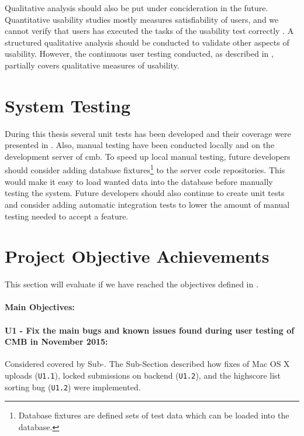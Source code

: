 Qualitative analysis should also be put under concideration in the future. Quantitative usability studies mostly measures satisfiability of users, and we cannot verify that users has executed the tasks of the usability test correctly \cite{holzinger2005}. A structured qualitative analysis should be conducted to validate other aspects of usability. However, the continuous user testing conducted, as described in , partially covers qualitative measures of usability.

\section{System Testing}
\label{sec:eval-sys-testing}
During this thesis several unit tests has been developed and their coverage were presented in . Also, manual testing have been conducted locally and on the development server of \gls{cmb}. To speed up local manual testing, future developers should consider adding database fixtures\footnote{Database fixtures are defined sets of test data which can be loaded into the database.} to the server code repositories. This would make it easy to load wanted data into the database before manually testing the system. Future developers should also continue to create unit tests and consider adding automatic integration tests to lower the amount of manual testing needed to accept a feature.

\section{Project Objective Achievements}
\label{sec:eval-pr-achiev}
This section will evaluate if we have reached the objectives defined in .

\paragraph*{Main Objectives:} \hfill

\paragraph*{U1 - Fix the main bugs and known issues found during user testing of CMB in November 2015:} Considered covered by Sub-. The Sub-Section described how fixes of Mac OS X uploads (\texttt{U1.1}), locked submissions on backend (\texttt{U1.2}), and the highscore list sorting bug (\texttt{U1.2}) were implemented.

